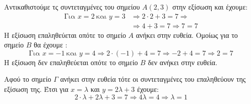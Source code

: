 \lysh
\begin{alist}
\item Αντικαθιστούμε τς συντεταγμένες του σημείου $ A(2,3) $ στην εξίσωση και έχουμε:
\begin{align*}
\textrm{Για }x=2\ \textrm{και }y=3&\Rightarrow 2\cdot 2+3=7\Rightarrow\\&\Rightarrow 4+3=7\Rightarrow 7=7
\end{align*}
Η εξίσωση επαληθεύεται οπότε το σημείο $ A $ ανήκει στην ευθεία. Ομοίως για το σημείο $ B $ θα έχουμε :
\[ \textrm{Για }x=-1\ \textrm{και }y=4\Rightarrow 2\cdot (-1)+4=7\Rightarrow -2+4=7\Rightarrow 2=7 \]
Η εξίσωση δεν επαληθεύεται οπότε το σημείο $ B $ δεν ανήκει στην ευθεία.
\item Αφού το σημείο $ \varGamma $ ανήκει στην ευθεία τότε οι συντεταγμένες του επαληθεύουν της εξίσωση της. Έτσι για $ x=\lambda $ και $ y=2\lambda+3 $ έχουμε:
\[ 2\cdot\lambda+2\lambda+3=7\Rightarrow 4\lambda=4\Rightarrow\lambda=1 \]
\end{alist}
